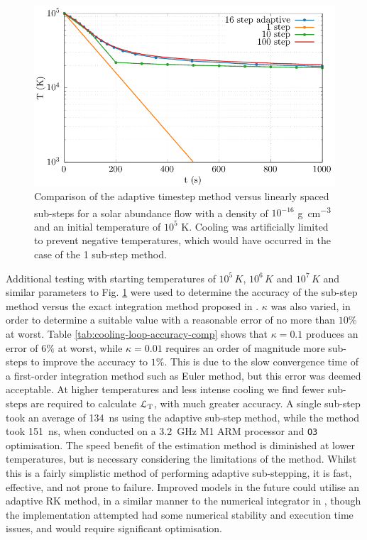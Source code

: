 \begin{figure}[ht]
  \centering
  \includegraphics{assets/plasma-cooling-benchmarks/evolution.pdf}
  \caption[Cooling sub-step method evolution comparison]{Comparison of the adaptive timestep method versus linearly spaced sub-steps for a solar abundance flow with a density of $10^{-16}$ \si{\gram\per\centi\metre\cubed} and an initial temperature of $10^5$ \si{\kelvin}. Cooling was artificially limited to prevent negative temperatures, which would have occurred in the case of the 1 sub-step method.}
  \label{fig:cooling-loop-evolution}
\end{figure}

Additional testing with starting temperatures of $10^5 \, \si{K}$, $10^6 \, \si{K}$ and $10^7 \, \si{K}$ and similar parameters to Fig. \ref{fig:cooling-loop-evolution} were used to determine the accuracy of the sub-step method versus the exact integration method proposed in \textcite{townsendExactIntegrationScheme2009}.
$\kappa$ was also varied, in order to determine a suitable value with a reasonable error of no more than $10\%$ at worst. 
Table \ref{tab:cooling-loop-accuracy-comp} shows that $\kappa = 0.1$ produces an error of $6\%$ at worst, while $\kappa = 0.01$ requires an order of magnitude more sub-steps to improve the accuracy to $1\%$.
This is due to the slow convergence time of a first-order integration method such as Euler method, but this error was deemed acceptable.
At higher temperatures and less intense cooling we find fewer sub-steps are required to calculate $\mathcal{L}_\text{T}$, with much greater accuracy.
A single sub-step took an average of \SI{134}{\nano\second} using the adaptive sub-step method, while the \textcite{townsendExactIntegrationScheme2009} method took \SI{151}{\nano\second}, when conducted on a \SI{3.2}{\giga\hertz} M1 ARM processor and \texttt{O3} optimisation.
The speed benefit of the estimation method is diminished at lower temperatures, but is necessary considering the limitations of the \textcite{townsendExactIntegrationScheme2009} method.
Whilst this is a fairly simplistic method of performing adaptive sub-stepping, it is fast, effective, and not prone to failure.
Improved models in the future could utilise an adaptive RK method, in a similar manner to the numerical integrator in \athena{}, though the implementation attempted had some numerical stability and execution time issues, and would require significant optimisation.

